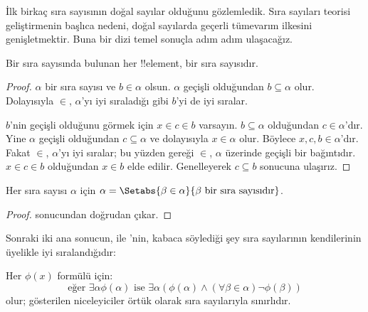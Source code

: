 


İlk birkaç sıra sayısının doğal sayılar olduğunu gözlemledik. Sıra sayıları
teorisi geliştirmenin başlıca nedeni, doğal sayılarda geçerli tümevarım
ilkesini genişletmektir. Buna bir dizi temel sonuçla adım adım ulaşacağız.

\begin{lem}
Bir sıra sayısında bulunan her !!{element}, bir sıra sayısıdır.
\end{lem}

\begin{proof}
$\alpha$ bir sıra sayısı ve $b\in\alpha$ olsun. $\alpha$ geçişli olduğundan
$b\subseteq\alpha$ olur. Dolayısıyla $\in$, $\alpha$'yı iyi sıraladığı gibi
$b$'yi de iyi sıralar.

$b$'nin geçişli olduğunu görmek için $x\in c\in b$ varsayın.
$b\subseteq\alpha$ olduğundan $c\in\alpha$'dır. Yine $\alpha$ geçişli
olduğundan $c\subseteq\alpha$ ve dolayısıyla $x\in\alpha$ olur. Böylece
$x,c,b\in\alpha$'dır. Fakat $\in$, $\alpha$'yı iyi sıralar; bu yüzden
 gereği $\in$, $\alpha$ üzerinde
geçişli bir bağıntıdır. $x\in c\in b$ olduğundan $x\in b$ elde edilir.
Genelleyerek $c\subseteq b$ sonucuna ulaşırız.
\end{proof}

\begin{cor}
Her sıra sayısı $\alpha$ için
$\alpha=\Setabs{\beta\in\alpha}{\beta\text{ bir sıra sayısıdır}}$.
\end{cor}

\begin{proof}
 sonucundan doğrudan çıkar.
\end{proof}

Sonraki iki ana sonucun,  ile
'nin, kabaca söylediği şey sıra sayılarının
kendilerinin üyelikle iyi sıralandığıdır:

\begin{thm}
Her $\phi(x)$ formülü için:
\[
	\text{eğer }\exists \alpha \phi(\alpha)\text{ ise }\exists \alpha(\phi(\alpha)
	\land  (\forall \beta \in \alpha) \lnot \phi(\beta))
\]
olur; gösterilen niceleyiciler örtük olarak sıra sayılarıyla sınırlıdır.
\end{thm}

